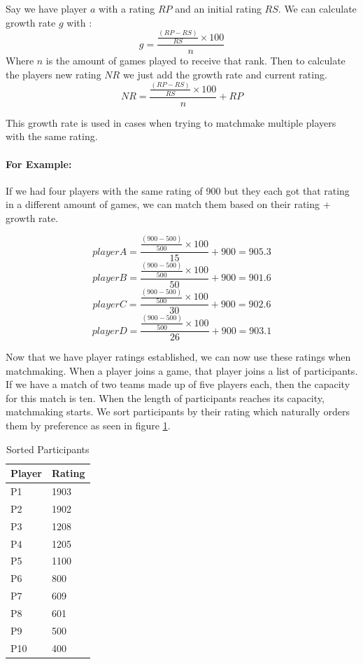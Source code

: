 \newpage
Say we have player $a$ with a rating $RP$ and an initial rating $RS$.
We can calculate growth rate $g$ with \cite{growth}: 
\[ g = \frac{\frac{(RP - RS)}{RS} \times 100}{n} \] 
Where $n$ is the amount of games played to receive that rank.\hfill \break
Then to calculate the players new rating $NR$ we just add the growth rate and current rating.
\[ NR = \frac{\frac{(RP - RS)}{RS} \times 100}{n} + RP \]

This growth rate is used in cases when trying to matchmake multiple players with the same rating.\hfill

\paragraph{For Example:} If we had four players with the same rating of 900 but they each got that rating in a different amount of games, we can match them based on their rating + growth rate.

\[ player A = \frac{\frac{(900 - 500)}{500} \times 100}{15} + 900 = 905.3 \]
\[ player B = \frac{\frac{(900 - 500)}{500} \times 100}{50} + 900 = 901.6 \]
\[ player C = \frac{\frac{(900 - 500)}{500} \times 100}{30} + 900 = 902.6 \]
\[ player D = \frac{\frac{(900 - 500)}{500} \times 100}{26} + 900 = 903.1 \]

\newpage
Now that we have player ratings established, we can now use these ratings when matchmaking. When a player joins a game, that player joins a list of participants. If we have a match of two teams made up of five players each, then the capacity for this match is ten. When the length of participants reaches its capacity, matchmaking starts. 
We sort participants by their rating which naturally orders them by preference as seen in figure \ref{tikz:sortedparticipants}.

\begin{table}[h]
	\centering
	\begin{tabular}{ll}
		\toprule
		Player & Rating \\
		\midrule
		P1     & 1903   \\
		P2     & 1902   \\
		P3     & 1208   \\
		P4     & 1205   \\
		P5     & 1100   \\
		P6     & 800    \\
		P7     & 609    \\
		P8     & 601    \\
		P9     & 500    \\
		P10    & 400    \\ 
		\bottomrule    
	\end{tabular}
	\caption{Sorted Participants}
	\label{tikz:sortedparticipants}
\end{table}

